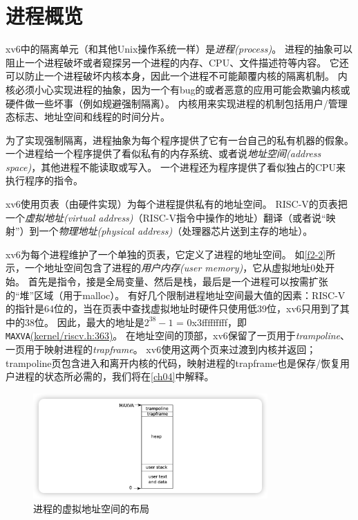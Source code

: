 \section{进程概览}
xv6中的隔离单元（和其他Unix操作系统一样）是\emph{进程(process)}。
进程的抽象可以阻止一个进程破坏或者窥探另一个进程的内存、CPU、文件描述符等内容。
它还可以防止一个进程破坏内核本身，因此一个进程不可能颠覆内核的隔离机制。
内核必须小心实现进程的抽象，因为一个有bug的或者恶意的应用可能会欺骗内核或硬件做一些坏事（例如规避强制隔离）。
内核用来实现进程的机制包括用户/管理态标志、地址空间和线程的时间分片。

为了实现强制隔离，进程抽象为每个程序提供了它有一台自己的私有机器的假象。
一个进程给一个程序提供了看似私有的内存系统、或者说\emph{地址空间(address space)}，其他进程不能读取或写入。
一个进程还为程序提供了看似独占的CPU来执行程序的指令。

xv6使用页表（由硬件实现）为每个进程提供私有的地址空间。
RISC-V的页表把一个\emph{虚拟地址(virtual address)}（RISC-V指令中操作的地址）翻译（或者说“映射”）到一个\emph{物理地址(physical address)}（处理器芯片送到主存的地址）。

xv6为每个进程维护了一个单独的页表，它定义了进程的地址空间。
如\autoref{f2-2}所示，一个地址空间包含了进程的\emph{用户内存(user memory)}，它从虚拟地址0处开始。
首先是指令，接是全局变量、然后是栈，最后是一个进程可以按需扩张的“堆”区域（用于malloc）。
有好几个限制进程地址空间最大值的因素：RISC-V的指针是64位的，当在页表中查找虚拟地址时硬件只使用低39位，xv6只用到了其中的38位。
因此，最大的地址是$2^{38} - 1$ = 0x3fffffffff，即\texttt{MAXVA}\href{https://github.com/mit-pdos/xv6-riscv/blob/riscv/kernel/riscv.h#L363}{(kernel/riscv.h:363)}。
在地址空间的顶部，xv6保留了一页用于\emph{trampoline}、一页用于映射进程的\emph{trapframe}。
xv6使用这两个页来过渡到内核并返回；trampoline页包含进入和离开内核的代码，映射进程的trapframe也是保存/恢复用户进程的状态所必需的，我们将在\autoref{ch04}中解释。

\begin{figure}[htbp]
    \centering
    \includegraphics[width=0.8\textwidth]{../imgs/f2-2.png}
    \caption{进程的虚拟地址空间的布局}
    \label{f2-2}
\end{figure}

